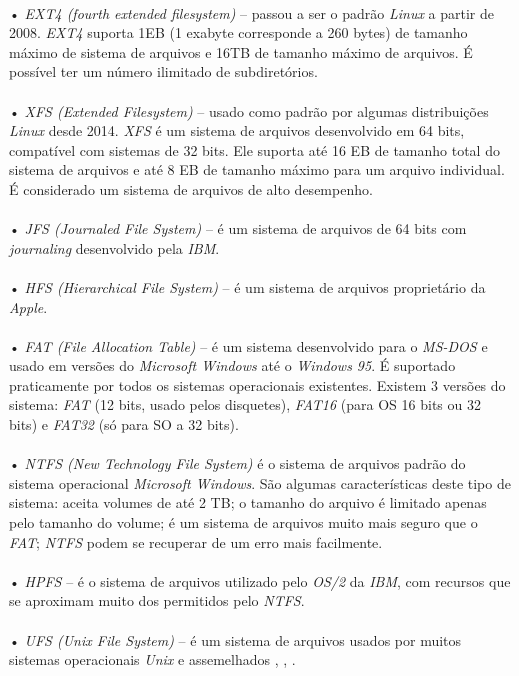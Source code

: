 \\•	\emph{EXT4 (fourth extended filesystem)} – passou a ser o padrão \emph{Linux} a partir de 2008. \emph{EXT4} suporta 1EB (1 exabyte corresponde a 260 bytes) de tamanho máximo de sistema de arquivos e 16TB de tamanho máximo de arquivos. É possível ter um número ilimitado de subdiretórios.\\
\\•	\emph{XFS (Extended Filesystem)} – usado como padrão por algumas distribuições \emph{Linux} desde 2014. \emph{XFS} é um sistema de arquivos desenvolvido em 64 bits, compatível com sistemas de 32 bits. Ele suporta até 16 EB de tamanho total do sistema de arquivos e até 8 EB de tamanho máximo para um arquivo individual. É considerado um sistema de arquivos de alto desempenho.\\
\\•	\emph{JFS (Journaled File System)} – é um sistema de arquivos de 64 bits com \emph{journaling} desenvolvido pela \emph{IBM}.\\
\\•	\emph{HFS (Hierarchical File System)} – é um sistema de arquivos proprietário da \emph{Apple}.\\
    \\•	\emph{FAT (File Allocation Table)} – é um sistema desenvolvido para o \emph{MS-DOS} e usado em versões do \emph{Microsoft Windows} até o \emph{Windows 95}. É suportado praticamente por todos os sistemas operacionais existentes. Existem 3 versões do sistema: \emph{FAT} (12 bits, usado pelos disquetes), \emph{FAT16} (para OS 16 bits ou 32 bits) e \emph{FAT32} (só para SO a 32 bits).\\
\\•	\emph{NTFS (New Technology File System)} é o sistema de arquivos padrão do sistema operacional \emph{Microsoft Windows}. São algumas características deste tipo de sistema: aceita volumes de até 2 TB; o tamanho do arquivo é limitado apenas pelo tamanho do volume; é um sistema de arquivos muito mais seguro que o \emph{FAT}; \emph{NTFS }podem se recuperar de um erro mais facilmente.\\
\\•	\emph{HPFS} –  é o sistema de arquivos utilizado pelo \emph{OS/2} da \emph{IBM}, com recursos que se aproximam muito dos permitidos pelo \emph{NTFS}.\\
\\•	\emph{UFS (Unix File System)} – é um sistema de arquivos usados por muitos sistemas operacionais \emph{Unix} e assemelhados \cite{Morimoto2011}, \cite{guialinux2020}, \cite{luciano2015}.\\

